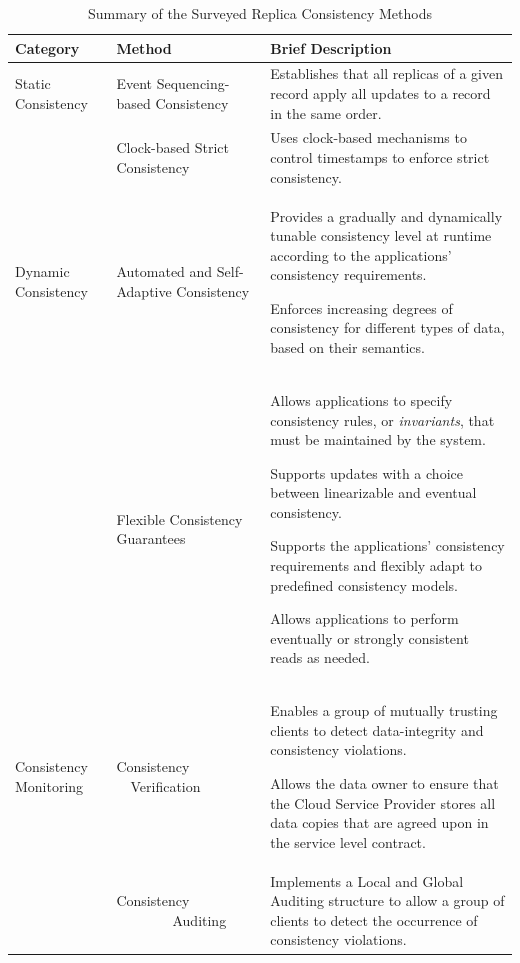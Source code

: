 \begin{table}[t]
	\setlength\extrarowheight{4pt}
	\centering
	\footnotesize{
		\caption{Summary of the Surveyed Replica  Consistency Methods}
		\vspace{1mm}
		\label{tab:surveyedMethods}
		\begin{tabular}{>{\raggedright\arraybackslash}p{2.0cm}>{\raggedright\arraybackslash}p{3.2cm}>{\raggedright\arraybackslash}p{10.5cm}}
			\hline
			Category   & Method    & Brief Description \\ \hline
			Static Consistency & Event Sequencing-based Consistency \cite{cooper2008pnuts} & Establishes that all replicas of a given record apply all updates to a record in the same order. \\                                                   
			& Clock-based Strict Consistency \cite{Corbett:2013, Du2013, salomie2015scaling} & Uses clock-based mechanisms to control timestamps to enforce strict consistency. \\ \hline
			
			Dynamic Consistency  & Automated and Self-Adapt\-ive Con\-sist\-en\-cy \cite{chihoub2012harmony, esteves2012quality, Terry:2013} & Provides a gradually and dynamically tunable consistency level at runtime according to the applications' consistency requirements. \par Enforces increasing degrees of consistency for different types of data, based on their semantics.\\
			& Flexible Consistency Guarantees \cite{balegas2015putting, BernsteinBBCFKK17, Chen:2014, sivasubramanian2012amazon} & Allows applications to specify consistency rules, or \textit{invariants}, that must be maintained by the system. \par Supports updates with a choice between linearizable and eventual consistency. \par Supports the applications' consistency requirements and flexibly adapt to predefined consistency models. \par Allows applications to perform eventually or strongly consistent reads as needed.  \\ \hline
			
			Consistency Monitoring  & Consistency \ \ Verification \cite{BrandenburgerCK15, MukundanML12} & Enables a group of mutually trusting clients to detect data-integrity and consistency violations.  \par Allows the data owner to ensure that the Cloud Service Provider stores all data copies that are agreed upon in the service level contract.  \\
			& Consistency \ \ \ \ \ \ \ \ Auditing \cite{liu2014consistency,MathBiradar:2013} & Implements a Local and Global Auditing structure to allow a group of clients to detect the occurrence of consistency violations.    \\
			\hline
	\end{tabular}}
\end{table}

